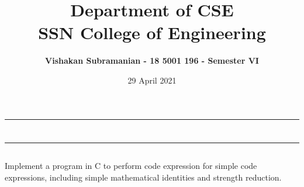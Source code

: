 \documentclass[12pt, a4]{article}
\title{\textbf{Department of CSE\\SSN College of Engineering}}
\author{\textbf{Vishakan Subramanian - 18 5001 196 - Semester VI}}
\date{29 April 2021}
\begin{document}
\maketitle
\hrule
\section*{}
\hrule
\bigskip

\subsection*{}
\subsection*{}
\begin{flushleft}
Implement a program in C to perform code expression for simple code expressions, including simple mathematical identities and strength reduction.

\end{flushleft}

\newpage
\subsection*{}
\begin{flushleft}

\end{flushleft}

\newpage
\subsection*{}
\begin{flushleft}

\end{flushleft}

\newpage
\end{document}
